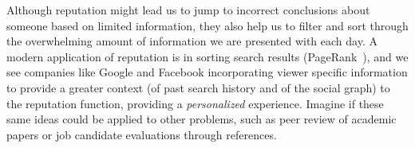 Although reputation might lead us to jump to incorrect conclusions about
someone based on limited information, they also help us to filter and
sort through the overwhelming amount of information we are presented
with each day.
A modern application of reputation is in sorting search
results (\eg PageRank~\cite{Page1999}), and we see companies
like Google and Facebook incorporating viewer specific information
to provide a greater context (of past search history and of
the social graph) to the reputation function, providing a
\textit{personalized} experience.
Imagine if these same ideas could be applied to other
problems, such as peer review of academic papers or
job candidate evaluations through references.

